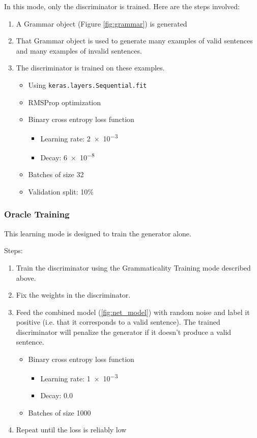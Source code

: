 \documentclass[11pt]{article}
\begin{document}
In this mode, only the discriminator is trained. Here are the steps involved:
\begin{enumerate}
    \item A Grammar object (Figure \ref{fig:grammar}) is generated
    \item That Grammar object is used to generate many examples of valid sentences and many examples of invalid sentences.
    \item The discriminator is trained on these examples.
    \begin{itemize}
        \item Using \texttt{keras.layers.Sequential.fit}
        \item RMSProp optimization
        \item Binary cross entropy loss function
        \begin{itemize}
            \item Learning rate: \num{2e-3}
            \item Decay: \num{6e-8}
        \end{itemize}
        \item Batches of size 32
        \item Validation split: 10\%
    \end{itemize}
\end{enumerate}

\subsubsection{Oracle Training}

This learning mode is designed to train the generator alone.

Steps:
\begin{enumerate}
    \item Train the discriminator using the Grammaticality Training mode described above.
    \item Fix the weights in the discriminator.
    \item Feed the combined model (\ref{fig:net_model}) with random noise and label it positive (i.e. that it corresponds to a valid sentence). The trained discriminator will penalize the generator if it doesn't produce a valid sentence.
    \begin{itemize}
        \item Binary cross entropy loss function
        \begin{itemize}
            \item Learning rate: \num{1e-3}
            \item Decay: \num{0.0}
        \end{itemize}
        \item Batches of size 1000
    \end{itemize}
    \item Repeat until the loss is reliably low
\end{enumerate}
\end{document}
